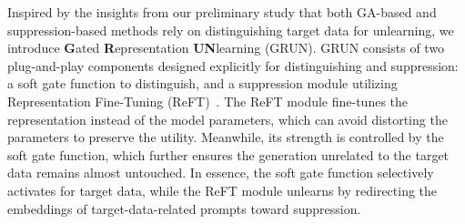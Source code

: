 

Inspired by the insights from our preliminary study
that both GA-based and suppression-based methods rely on distinguishing target data for unlearning, we introduce \textbf{G}ated \textbf{R}epresentation \textbf{UN}learning (GRUN). GRUN consists of two plug-and-play components designed explicitly for distinguishing and suppression: a soft gate function to distinguish, and a suppression module utilizing Representation Fine-Tuning (ReFT)~\cite{wu2024reft}. The ReFT module fine-tunes the representation instead of the model parameters, which can avoid distorting the parameters to preserve the utility. Meanwhile, its strength is controlled by the soft gate function, which further ensures the generation unrelated to the target data remains almost untouched. In essence, the soft gate function selectively activates for target data, while the ReFT module unlearns by redirecting the embeddings of target-data-related prompts toward suppression.

